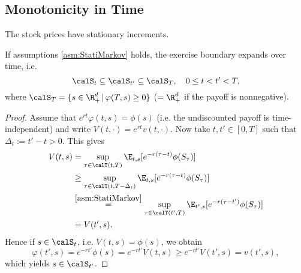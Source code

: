 \subsection{Monotonicity in Time}
\begin{asm} \label{asm:StatiMarkov}
The stock prices have stationary increments. 
\end{asm}
\begin{lemma}
If assumptions \ref{asm:StatiMarkov} holds, the exercise boundary  expands over time, i.e. 
$$ \calS_t \subseteq \calS_{t'} \subseteq \calS_T, \quad 0\le t < t' <T,$$
where $\calS_T = \{s \in \R^d_+ \,|\, \varphi(T,s)\ge 0\}$ ($= \R_+^d$ if the payoff is nonnegative).
\end{lemma}
\begin{proof}
Assume that $e^{rt}\varphi(t,s)=\phi(s)$ (i.e. the undiscounted  payoff is time-independent) and write $V(t,\cdot)=e^{rt}v(t,\cdot)$.  Now take $t,t'\in [0,T]$ such that $\Delta_t := t'-t>0$. This gives%
\begin{align*}
    V(t,s)&=\sup_{\tau \in \calT(t,T)} \E_{t,s}[e^{-r(\tau-t)}\phi(S_{\tau})]\\
    &\ge \sup_{\tau \in \calT(t,T-\Delta_t)} \E_{t,s}[e^{-r(\tau-t)}\phi(S_{\tau})]\\
    &\overset{\ref{asm:StatiMarkov}}{=}  \sup_{\tau \in \calT(t',T)} \E_{t',s}[e^{-r(\tau-t')}\phi(S_{\tau})] \\%
    &=  V(t',s).
\end{align*}
Hence if $s \in \calS_t$, i.e. $V(t,s)=\phi(s)$, we obtain 
$$\varphi(t',s)= e^{-r t'}\phi(s) = e^{-r t'}V(t,s)\geq  e^{-rt'}V(t',s)=v(t',s),$$
which yields $s \in \calS_{t'}$.

\end{proof}

